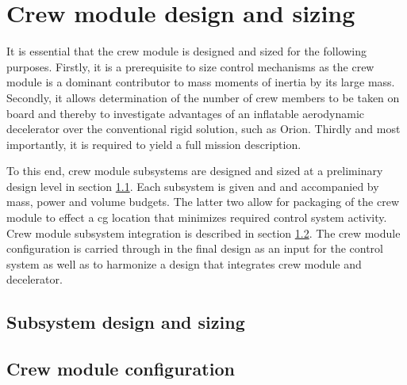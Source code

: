 \section{Crew module design and sizing}\label{ch:crewmod}
It is essential that the crew module is designed and sized for the following purposes. Firstly, it is a prerequisite to size control mechanisms as the crew module is a dominant contributor to mass moments of inertia by its large mass. Secondly, it allows determination of the number of crew members to be taken on board and thereby to investigate advantages of an inflatable aerodynamic decelerator over the conventional rigid solution, such as Orion. Thirdly and most importantly, it is required to yield a full mission description.

To this end, crew module subsystems are designed and sized at a preliminary design level in section \ref{sec:crewsubsys}. Each subsystem is given and and accompanied by mass, power and volume budgets. The latter two allow for packaging of the crew module to effect a \gls{cg} location that minimizes required control system activity. Crew module subsystem integration is described in section \ref{sec:crewpackaging}. The crew module configuration is carried through in the final design as an input for the control system as well as to harmonize a design that integrates crew module and decelerator.

\subsection{Subsystem design and sizing} \label{sec:crewsubsys}


\subsection{Crew module configuration} \label{sec:crewpackaging}


